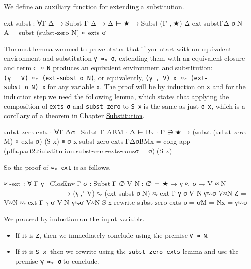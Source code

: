 We define an auxiliary function for extending a substitution.

\begin{fence}
\begin{code}
ext-subst : ∀{Γ Δ} → Subst Γ Δ → Δ ⊢ ★ → Subst (Γ , ★) Δ
ext-subst{Γ}{Δ} σ N {A} = subst (subst-zero N) ∘ exts σ
\end{code}
\end{fence}

The next lemma we need to prove states that if you start with an
equivalent environment and substitution \texttt{γ\ ≈ₑ\ σ}, extending
them with an equivalent closure and term \texttt{c\ ≈\ N} produces an
equivalent environment and substitution:
\texttt{(γ\ ,\textquotesingle{}\ V)\ ≈ₑ\ (ext-subst\ σ\ N)}, or
equivalently,
\texttt{(γ\ ,\textquotesingle{}\ V)\ x\ ≈ₑ\ (ext-subst\ σ\ N)\ x} for
any variable \texttt{x}. The proof will be by induction on \texttt{x}
and for the induction step we need the following lemma, which states
that applying the composition of \texttt{exts\ σ} and
\texttt{subst-zero} to \texttt{S\ x} is the same as just \texttt{σ\ x},
which is a corollary of a theorem in Chapter
\protect\hyperlink{Substitution}{Substitution}.

\begin{fence}
\begin{code}
subst-zero-exts : ∀{Γ Δ}{σ : Subst Γ Δ}{B}{M : Δ ⊢ B}{x : Γ ∋ ★}
  → (subst (subst-zero M) ∘ exts σ) (S x) ≡ σ x
subst-zero-exts {Γ}{Δ}{σ}{B}{M}{x} =
   cong-app (plfa.part2.Substitution.subst-zero-exts-cons{σ = σ}) (S x)
\end{code}
\end{fence}

So the proof of \texttt{≈ₑ-ext} is as follows.

\begin{fence}
\begin{code}
≈ₑ-ext : ∀ {Γ} {γ : ClosEnv Γ} {σ : Subst Γ ∅} {V} {N : ∅ ⊢ ★}
  → γ ≈ₑ σ  →  V ≈ N
    --------------------------
  → (γ ,' V) ≈ₑ (ext-subst σ N)
≈ₑ-ext {Γ} {γ} {σ} {V} {N} γ≈ₑσ V≈N {Z} = V≈N
≈ₑ-ext {Γ} {γ} {σ} {V} {N} γ≈ₑσ V≈N {S x}
  rewrite subst-zero-exts {σ = σ}{M = N}{x} = γ≈ₑσ
\end{code}
\end{fence}

We proceed by induction on the input variable.

\begin{itemize}
\item
  If it is \texttt{Z}, then we immediately conclude using the premise
  \texttt{V\ ≈\ N}.
\item
  If it is \texttt{S\ x}, then we rewrite using the
  \texttt{subst-zero-exts} lemma and use the premise \texttt{γ\ ≈ₑ\ σ}
  to conclude.
\end{itemize}


